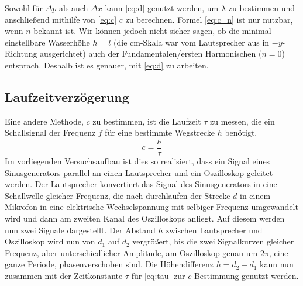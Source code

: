 Sowohl für \(\Delta p\) als auch \(\Delta x\) kann \cref{eq:d} genutzt werden, um \(\lambda\) zu bestimmen und anschließend mithilfe von \cref{eq:c} \(c\) zu berechnen. Formel \cref{eq:c_n} ist nur nutzbar, wenn \(n\) bekannt ist. Wir können jedoch nicht sicher sagen, ob die minimal einstellbare Wasserhöhe \(h=l\) (die cm-Skala war vom Lautsprecher aus in \(-y\)-Richtung ausgerichtet) auch der Fundamentalen/ersten Harmonischen (\(n=0\)) entsprach. Deshalb ist es genauer, mit \cref{eq:d} zu arbeiten.

\subsection{Laufzeitverzögerung}
Eine andere Methode, \(c\) zu bestimmen, ist die Laufzeit \(\tau\) zu messen, die ein Schallsignal der Frequenz \(f\) für eine bestimmte Wegstrecke \(h\) benötigt. 
\begin{equation}
    c=\frac{h}{\tau}
    \label{eq:tau}
\end{equation}
Im vorliegenden Versuchsaufbau ist dies so realisiert, dass ein Signal eines Sinusgenerators parallel an einen Lautsprecher und ein Oszilloskop geleitet werden. Der Lautsprecher konvertiert das Signal des Sinusgenerators in eine Schallwelle gleicher Frequenz, die nach durchlaufen der Strecke \(d\) in einem Mikrofon in eine elektrische Wechselspannung mit selbiger Frequenz umgewandelt wird und dann am zweiten Kanal des Oszilloskops anliegt. Auf diesem werden nun zwei Signale dargestellt. 
Der Abstand \(h\) zwischen Lautsprecher und Oszilloskop wird nun von \(d_1\) auf \(d_2\) vergrößert, bis die zwei Signalkurven gleicher Frequenz, aber unterschiedlicher Amplitude, am Oszilloskop genau um \(2\pi\), eine ganze Periode, phasenverschoben sind. Die Höhendifferenz \(h=d_2-d_1\) kann nun zusammen mit der Zeitkonstante \(\tau\) für \cref{eq:tau} zur \(c\)-Bestimmung genutzt werden.
